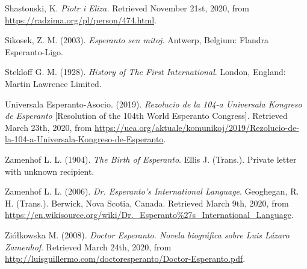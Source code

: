 Shastouski, K. \textit{Piotr i Eliza.} Retrieved November 21st, 2020, from \url{https://radzima.org/pl/person/474.html}.

Sikosek, Z. M. (2003). \textit{Esperanto sen mitoj.} Antwerp, Belgium: Flandra Esperanto-Ligo. 

Stekloff G. M. (1928). \textit{History of The First International}. London, England: Martin Lawrence Limited.

Universala Esperanto-Asocio. (2019). \textit{Rezolucio de la 104-a Universala Kongreso de Esperanto} [Resolution of the 104th World Esperanto Congress]. Retrieved March 23th, 2020, from \url{https://uea.org/aktuale/komunikoj/2019/Rezolucio-de-la-104-a-Universala-Kongreso-de-Esperanto}.

Zamenhof L. L. (1904). \textit{The Birth of Esperanto}. Ellis J. (Trans.). Private letter with unknown recipient.

Zamenhof L. L. (2006). \textit{Dr. Esperanto's International Language}. Geoghegan, R. H. (Trans.). Berwick, Nova Scotia, Canada. Retrieved March 9th, 2020, from \url{https://en.wikisource.org/wiki/Dr._Esperanto\%27s_International_Language}.

Ziółkowska M. (2008). \textit{Doctor Esperanto. Novela biográfica sobre Luis Lázaro Zamenhof}. Retrieved March 24th, 2020, from \url{http://luisguillermo.com/doctoresperanto/Doctor-Esperanto.pdf}.
